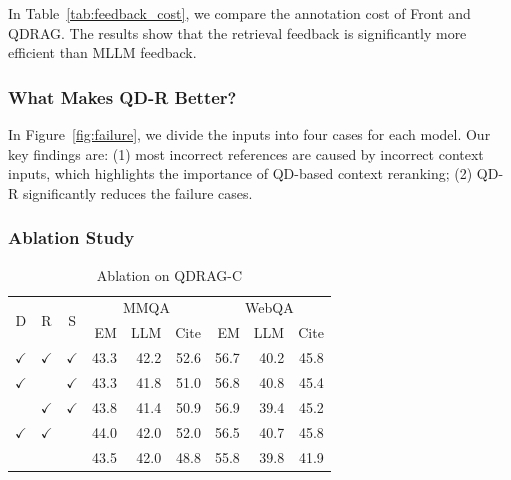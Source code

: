 \documentclass[letterpaper]{article} %
\begin{document}
In Table~\ref{tab:feedback_cost}, we compare the annotation cost of Front and QDRAG. The results show that the retrieval feedback is significantly more efficient than MLLM feedback. 

\subsubsection{What Makes QD-R Better?}

In Figure~\ref{fig:failure}, we divide the inputs into four cases for each model. Our key findings are: (1) most incorrect references are caused by incorrect context inputs, which highlights the importance of QD-based context reranking; (2) QD-R significantly reduces the failure cases.



\subsubsection{Ablation Study}


\begin{table}[t]
    
    \centering
\begin{tabular}{@{}cccrrrrrr@{}}
\toprule
\multirow{2}{*}{D} & \multirow{2}{*}{R} & \multirow{2}{*}{S} & \multicolumn{3}{c}{MMQA}& \multicolumn{3}{c}{WebQA}  \\
& & & EM & LLM & Cite & EM & LLM & Cite \\ \midrule
$\checkmark$ & $\checkmark$ & $\checkmark$ & 43.3 &42.2& 52.6 & 56.7 &40.2& 45.8\\ \midrule
$\checkmark$ &  & $\checkmark$ &43.3&41.8& 51.0 & 56.8 &40.8& 45.4\\
 & $\checkmark$ & $\checkmark$ &43.8&41.4& 50.9 & 56.9 &39.4& 45.2\\
 $\checkmark$ & $\checkmark$ &  &44.0&42.0&52.0 & 56.5 &40.7& 45.8\\
 &  &  & 43.5&42.0& 48.8 & 55.8 &39.8& 41.9\\
\bottomrule
\end{tabular}
\caption{Ablation on QDRAG-C}
    \label{tab:ablation_qdc}
\end{table}
\end{document}
